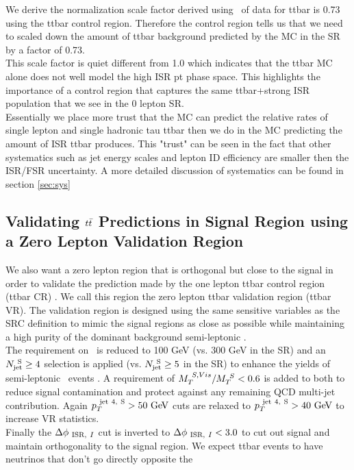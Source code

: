 \indent We derive the normalization scale factor derived using \intlumi\ \ifb of data for ttbar is 0.73 using the ttbar control region.  Therefore the control region tells us that we need to scaled down the amount of ttbar background predicted by the MC in the SR by a factor of 0.73. \\
\indent This scale factor is quiet different from 1.0 which indicates that the ttbar MC alone does not well model the high ISR pt phase space.  This highlights the importance of a control region that captures the same ttbar+strong ISR population that we see in the 0 lepton SR.  \\
\indent Essentially we place more trust that the MC can predict the relative rates of single lepton and single hadronic tau ttbar then we do in the MC predicting the amount of ISR ttbar produces. This "trust" can be seen in the fact that other systematics such as jet energy scales and lepton ID efficiency are smaller then the ISR/FSR uncertainty.  A more detailed discussion of systematics can be found in section \ref{sec:sys}\\

\subsection{Validating $t\bar{t}$ Predictions in Signal Region using a Zero Lepton Validation Region}
\label{sec:Bkg:ttbar:VR}

\indent We also want a zero lepton region that is orthogonal but close to the signal in order to validate the prediction made by the one lepton ttbar control region (ttbar CR) .  We call this region the zero lepton ttbar validation region (ttbar VR).  The validation region is designed using the same sensitive variables as the SRC definition to mimic the signal regions as close as possible while maintaining a high purity of the dominant background semi-leptonic \ttbar. \\
\indent The requirement on \MS\ is reduced to 100 GeV (vs. 300 GeV in the SR) and an $N_{\mathrm{jet}}^{~\mathrm{S}} \ge 4$ selection is applied (vs. $N_{\mathrm{jet}}^{~\mathrm{S}} \ge 5$ in the SR) to enhance the yields of semi-leptonic \ttbar\ events . A requirement of $M_{T}^{~S,Vis}/M_{T}^{~S} < 0.6$ is added to both to reduce signal contamination and protect against any remaining QCD multi-jet contribution. Again $\pTjV>50\gev$ cuts are relaxed to $\pTjV>40\gev$ to increase VR statistics. \\
Finally the $\Delta\phi_{~\mathrm{ISR},~I}$ cut is inverted to $\Delta\phi_{~\mathrm{ISR},~I}<3.0$ to cut out signal and maintain orthogonality to the signal region. We expect ttbar events to have neutrinos that don't go directly opposite the \\ 

